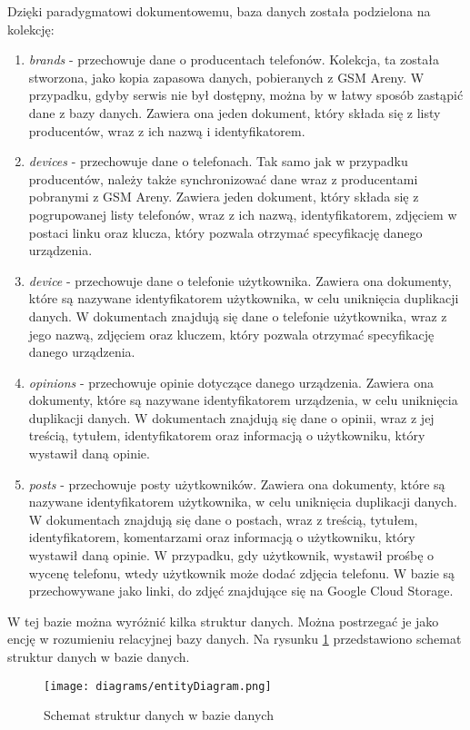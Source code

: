 Dzięki paradygmatowi dokumentowemu, baza danych została podzielona na kolekcję:
\begin{enumerate}
    \item \textit{brands} - przechowuje dane o producentach telefonów. Kolekcja, ta została stworzona, jako kopia zapasowa danych, pobieranych z GSM Areny. W przypadku, gdyby serwis nie był dostępny, można by w łatwy sposób zastąpić dane z bazy danych. Zawiera ona jeden dokument, który składa się z listy producentów, wraz z ich nazwą i identyfikatorem.
    \item \textit{devices} - przechowuje dane o telefonach. Tak samo jak w przypadku producentów, należy także synchronizować dane wraz z producentami pobranymi z GSM Areny. Zawiera jeden dokument, który składa się z pogrupowanej listy telefonów, wraz z ich nazwą, identyfikatorem, zdjęciem w postaci linku oraz klucza, który pozwala otrzymać specyfikację danego urządzenia.
    \item \textit{device} - przechowuje dane o telefonie użytkownika. Zawiera ona dokumenty, które są nazywane identyfikatorem użytkownika, w celu uniknięcia duplikacji danych. W dokumentach znajdują się dane o telefonie użytkownika, wraz z jego nazwą, zdjęciem oraz kluczem, który pozwala otrzymać specyfikację danego urządzenia.
    \item \textit{opinions} - przechowuje opinie dotyczące danego urządzenia. Zawiera ona dokumenty, które są nazywane identyfikatorem urządzenia, w celu uniknięcia duplikacji danych. W dokumentach znajdują się dane o opinii, wraz z jej treścią, tytułem, identyfikatorem oraz informacją o użytkowniku, który wystawił daną opinie.
    \item \textit{posts} - przechowuje posty użytkowników. Zawiera ona dokumenty, które są nazywane identyfikatorem użytkownika, w celu uniknięcia duplikacji danych. W dokumentach znajdują się dane o postach, wraz z treścią, tytułem, identyfikatorem, komentarzami oraz informacją o użytkowniku, który wystawił daną opinie. W przypadku, gdy użytkownik, wystawił prośbę o wycenę telefonu, wtedy użytkownik może dodać zdjęcia telefonu. W bazie są przechowywane jako linki, do zdjęć znajdujące się na Google Cloud Storage.
\end{enumerate}

W tej bazie można wyróżnić kilka struktur danych. Można postrzegać je jako encję w rozumieniu relacyjnej bazy danych. 
Na rysunku \ref{database} przedstawiono schemat struktur danych w bazie danych.

\begin{figure}[H]
    \centering
    \texttt{[image: diagrams/entityDiagram.png]}
    \caption{Schemat struktur danych w bazie danych}
    \label{database}
\end{figure}

